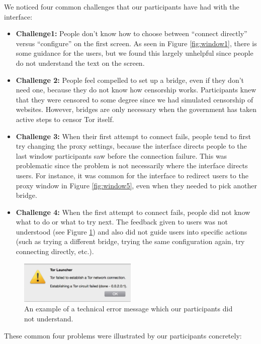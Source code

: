 \documentclass{template}
\begin{document}
We noticed four common challenges that our participants have had with the interface:  

\begin{itemize} \itemsep1pt \parskip0pt 
\item {\bfseries Challenge1:} People don't know how to choose between ``connect directly'' versus ``configure'' on the first screen. As seen in Figure \ref{fig:window1}, there is some guidance for the users, but we found this largely unhelpful since people do not understand the text on the screen. 
\item {\bfseries Challenge 2:} People feel compelled to set up a bridge, even if they don't need one, because they do not know how censorship works. Participants knew that they were censored to some degree since we had simulated censorship of websites. However, bridges are only necessary when the government has taken active steps to censor Tor itself.
\item {\bfseries Challenge 3:} When their first attempt to connect fails, people tend to first try changing the proxy settings, because the interface directs people to the last window participants saw before the connection failure. This was problematic since the problem is not necessarily where the interface directs users. For instance, it was common for the interface to redirect users to the proxy window in Figure \ref{fig:window5}, even when they needed to pick another bridge. 
\item {\bfseries Challenge 4:} When the first attempt to connect fails, people did not know what to do or what to try next. The feedback given to users was not understood (see Figure \ref{fig:error}) and also did not guide users into specific actions (such as trying a different bridge, trying the same configuration again, try connecting directly, etc.).
\end{itemize}

\begin{figure}[t]
\label{fig:error}
  \centering
    \includegraphics[width=0.5\textwidth]{error.png}
    \caption{An example of a technical error message which our participants did not understand.}
\end{figure}

These common four problems were illustrated by our participants concretely:
\end{document}
